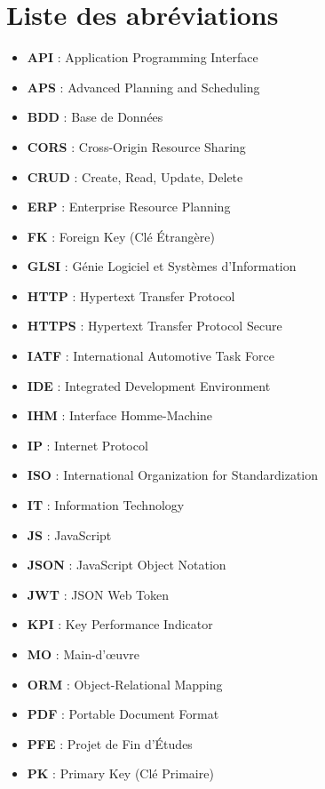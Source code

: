 \chapter*{Liste des abréviations}

\begin{itemize}
    \item \textbf{API} : Application Programming Interface
    \item \textbf{APS} : Advanced Planning and Scheduling
    \item \textbf{BDD} : Base de Données
    \item \textbf{CORS} : Cross-Origin Resource Sharing
    \item \textbf{CRUD} : Create, Read, Update, Delete
    \item \textbf{ERP} : Enterprise Resource Planning
    \item \textbf{FK} : Foreign Key (Clé Étrangère)
    \item \textbf{GLSI} : Génie Logiciel et Systèmes d'Information
    \item \textbf{HTTP} : Hypertext Transfer Protocol
    \item \textbf{HTTPS} : Hypertext Transfer Protocol Secure
    \item \textbf{IATF} : International Automotive Task Force
    \item \textbf{IDE} : Integrated Development Environment
    \item \textbf{IHM} : Interface Homme-Machine
    \item \textbf{IP} : Internet Protocol
    \item \textbf{ISO} : International Organization for Standardization
    \item \textbf{IT} : Information Technology
    \item \textbf{JS} : JavaScript
    \item \textbf{JSON} : JavaScript Object Notation
    \item \textbf{JWT} : JSON Web Token
    \item \textbf{KPI} : Key Performance Indicator
    \item \textbf{MO} : Main-d'œuvre
    \item \textbf{ORM} : Object-Relational Mapping
    \item \textbf{PDF} : Portable Document Format
    \item \textbf{PFE} : Projet de Fin d'Études
    \item \textbf{PK} : Primary Key (Clé Primaire)

\end{itemize}
